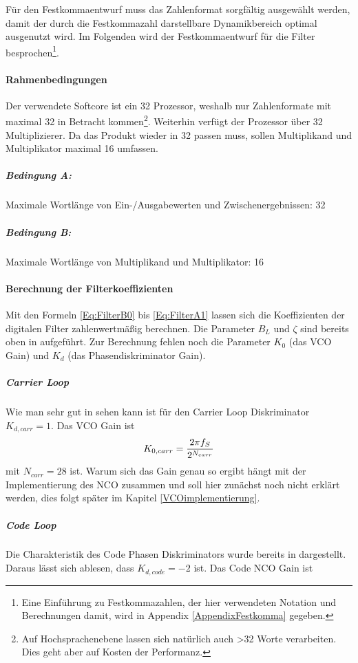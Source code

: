 Für den Festkommaentwurf muss das Zahlenformat sorgfältig ausgewählt werden, damit der durch die Festkommazahl darstellbare Dynamikbereich optimal ausgenutzt wird. Im Folgenden wird der Festkommaentwurf für die Filter besprochen\footnote{Eine Einführung zu Festkommazahlen, der hier verwendeten Notation und Berechnungen damit, wird in Appendix \ref{AppendixFestkomma} gegeben.}.

\paragraph{Rahmenbedingungen} Der verwendete Softcore ist ein \SI{32}{\bit} Prozessor, weshalb nur Zahlenformate mit maximal  \SI{32}{\bit} in Betracht kommen\footnote{Auf Hochsprachenebene lassen sich natürlich auch \SI{>32}{\bit} Worte verarbeiten. Dies geht aber auf Kosten der Performanz.}. Weiterhin verfügt der Prozessor über \SI{32}{\bit} Multiplizierer. Da das Produkt wieder in \SI{32}{\bit} passen muss, sollen Multiplikand und Multiplikator maximal \SI{16}{\bit} umfassen.

\subparagraph{Bedingung A:} Maximale Wortlänge von Ein-/Ausgabewerten und Zwischenergebnissen: \SI{32}{\bit}
\subparagraph{Bedingung B:} Maximale Wortlänge von Multiplikand und Multiplikator: \SI{16}{\bit}


\paragraph{Berechnung der Filterkoeffizienten}
Mit den Formeln \eqref{Eq:FilterB0} bis \eqref{Eq:FilterA1} lassen sich die Koeffizienten der digitalen Filter zahlenwertmäßig berechnen. Die Parameter $B_L$ und $\zeta$ sind bereits oben in  aufgeführt. Zur Berechnung fehlen noch die Parameter $K_0$ (das VCO Gain) und $K_d$ (das Phasendiskriminator Gain). 


\subparagraph{Carrier Loop}
Wie man sehr gut in  sehen kann ist für den Carrier Loop Diskriminator $K_{d,carr}=1$. Das VCO Gain ist
\begin{equation}
    K_{0,carr} = \frac{2 \pi f_S}{2^{N_{carr}}}
\end{equation}
mit $N_{carr}=28$ ist. Warum sich das Gain genau so ergibt hängt mit der Implementierung des NCO zusammen und soll hier zunächst noch nicht erklärt werden, dies folgt später im Kapitel \ref{VCOimplementierung}.

\subparagraph{Code Loop}
Die Charakteristik des Code Phasen Diskriminators wurde bereits in  dargestellt. Daraus lässt sich ablesen, dass $K_{d,code}=-2$ ist. Das Code NCO Gain ist 

